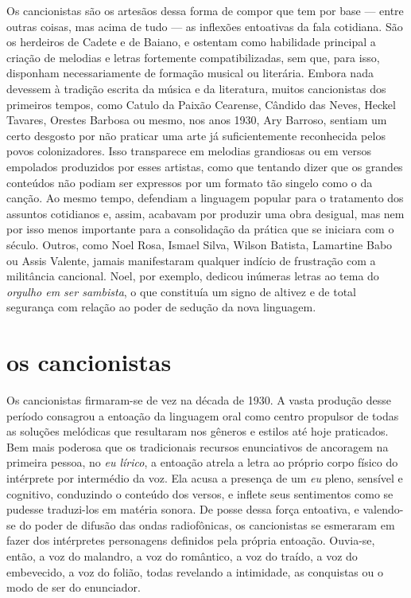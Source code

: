 Os cancionistas são os artesãos dessa forma de compor que tem por base
--- entre outras coisas, mas acima de tudo --- as inflexões entoativas
da fala cotidiana. São os herdeiros de Cadete e de Baiano, e ostentam
como habilidade principal a criação de melodias e letras fortemente
compatibilizadas, sem que, para isso, disponham necessariamente de
formação musical ou literária. Embora nada devessem à tradição escrita
da música e da literatura, muitos cancionistas dos primeiros tempos,
como Catulo da Paixão Cearense, Cândido das Neves, Heckel Tavares,
Orestes Barbosa ou mesmo, nos anos 1930, Ary Barroso, sentiam um certo
desgosto por não praticar uma arte já suficientemente reconhecida pelos
povos colonizadores. Isso transparece em melodias grandiosas ou em
versos empolados produzidos por esses artistas, como que tentando dizer
que os grandes conteúdos não podiam ser expressos por um formato tão
singelo como o da canção. Ao mesmo tempo, defendiam a linguagem popular
para o tratamento dos assuntos cotidianos e, assim, acabavam por
produzir uma obra desigual, mas nem por isso menos importante para a
consolidação da prática que se iniciara com o século. Outros, como Noel
Rosa, Ismael Silva, Wilson Batista, Lamartine Babo ou Assis Valente,
jamais manifestaram qualquer indício de frustração com a militância
cancional. Noel, por exemplo, dedicou inúmeras letras ao tema do
\textit{orgulho em ser sambista}, o que constituía um signo de altivez e de
total segurança com relação ao poder de sedução da nova linguagem.

\section{os cancionistas}

Os cancionistas firmaram-se de vez na década de 1930. A vasta produção
desse período consagrou a entoação da linguagem oral como centro
propulsor de todas as soluções melódicas que resultaram nos gêneros e
estilos até hoje praticados. Bem mais poderosa que os tradicionais
recursos enunciativos de ancoragem na primeira pessoa, no \textit{eu lírico},
a entoação atrela a letra ao próprio corpo físico do intérprete por
intermédio da voz. Ela acusa a presença de um \textit{eu} pleno, sensível e
cognitivo, conduzindo o conteúdo dos versos, e inflete seus sentimentos
como se pudesse traduzi-los em matéria sonora. De posse dessa força
entoativa, e valendo-se do poder de difusão das ondas radiofônicas, os
cancionistas se esmeraram em fazer dos intérpretes personagens definidos
pela própria entoação. Ouvia-se, então, a voz do malandro, a voz do
romântico, a voz do traído, a voz do embevecido, a voz do folião, todas
revelando a intimidade, as conquistas ou o modo de ser do enunciador.

